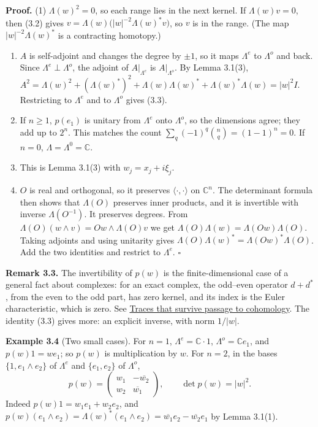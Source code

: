 \documentclass[
  11pt,
]{article}
\begin{document}
\textbf{Proof.} (1) \(\Lambda(w)^2=0\), so each range lies in the next
kernel. If \(\Lambda(w)v=0\), then (3.2) gives
\(v=\Lambda(w)\bigl(|w|^{-2}\Lambda(w)^*v\bigr)\), so \(v\) is in the
range. (The map \(|w|^{-2}\Lambda(w)^*\) is a contracting homotopy.)

\begin{enumerate}
\def\labelenumi{(\arabic{enumi})}
\setcounter{enumi}{1}
\item
  \(A\) is self-adjoint and changes the degree by \(\pm1\), so it maps
  \(\Lambda^e\) to \(\Lambda^o\) and back. Since
  \(\Lambda^e\perp\Lambda^o\), the adjoint of \(A|_{\Lambda^e}\) is
  \(A|_{\Lambda^o}\). By Lemma 3.1(3),
  \(A^2=\Lambda(w)^2+(\Lambda(w)^*)^2+\Lambda(w)\Lambda(w)^*+\Lambda(w)^*\Lambda(w)=|w|^2I\).
  Restricting to \(\Lambda^e\) and to \(\Lambda^o\) gives (3.3).
\item
  If \(n\ge1\), \(p(e_1)\) is unitary from \(\Lambda^e\) onto
  \(\Lambda^o\), so the dimensions agree; they add up to \(2^n\). This
  matches the count \(\sum_q(-1)^q\binom nq=(1-1)^n=0\). If \(n=0\),
  \(\Lambda=\Lambda^0=\mathbb C\).
\item
  This is Lemma 3.1(3) with \(w_j=x_j+i\xi_j\).
\item
  \(O\) is real and orthogonal, so it preserves
  \(\langle\cdot,\cdot\rangle\) on \(\mathbb C^n\). The determinant
  formula then shows that \(\Lambda(O)\) preserves inner products, and
  it is invertible with inverse \(\Lambda(O^{-1})\). It preserves
  degrees. From \(\Lambda(O)(w\wedge v)=Ow\wedge\Lambda(O)v\) we get
  \(\Lambda(O)\Lambda(w)=\Lambda(Ow)\Lambda(O)\). Taking adjoints and
  using unitarity gives
  \(\Lambda(O)\Lambda(w)^*=\Lambda(Ow)^*\Lambda(O)\). Add the two
  identities and restrict to \(\Lambda^e\). \(\square\)
\end{enumerate}

\textbf{Remark 3.3.} The invertibility of \(p(w)\) is the
finite-dimensional case of a general fact about complexes: for an exact
complex, the odd--even operator \(d+d^*\), from the even to the odd
part, has zero kernel, and its index is the Euler characteristic, which
is zero. See \href{traces-and-complexes.pdf}{Traces that survive passage
to cohomology}. The identity (3.3) gives more: an explicit inverse, with
norm \(1/|w|\).

\textbf{Example 3.4} (Two small cases). For \(n=1\),
\(\Lambda^e=\mathbb C\cdot1\), \(\Lambda^o=\mathbb C e_1\), and
\(p(w)1=we_1\); so \(p(w)\) is multiplication by \(w\). For \(n=2\), in
the bases \(\{1,e_1\wedge e_2\}\) of \(\Lambda^e\) and \(\{e_1,e_2\}\)
of \(\Lambda^o\), \[
p(w)=\begin{pmatrix}w_1&-\overline{w_2}\\ w_2&\overline{w_1}\end{pmatrix},\qquad \det p(w)=|w|^2 .
\] Indeed \(p(w)1=w_1e_1+w_2e_2\), and
\(p(w)(e_1\wedge e_2)=\Lambda(w)^*(e_1\wedge e_2)=\overline{w_1}e_2-\overline{w_2}e_1\)
by Lemma 3.1(1).
\end{document}
